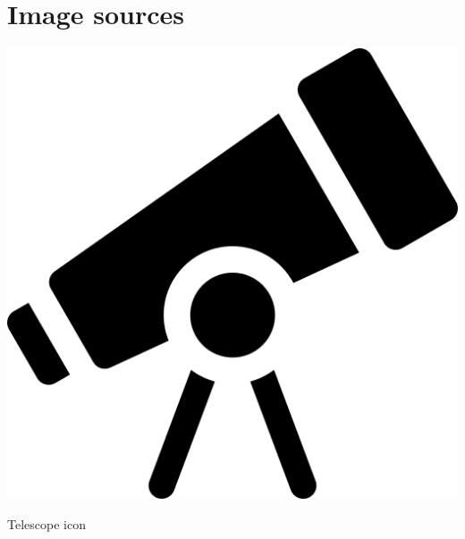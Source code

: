\documentclass{article}
\begin{document}
\section{Image sources}
\noindent
\begin{minipage}[t]{0.1\textwidth}
    \includegraphics[width=\linewidth]{Image/telescope.png}
\end{minipage}
\hfill
\begin{minipage}[t]{0.85\textwidth}
    Telescope icon \cite{flaticon_telescope_icon}
\end{minipage}

\vspace{1em} %
\end{document}
